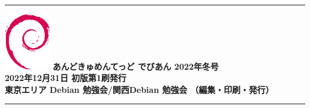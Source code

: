 \documentclass[mingoth,a4paper]{jsarticle}
\begin{document}
\vspace*{16cm}
{\color{dancerlightblue}\rule{\hsize}{1mm}}
\vspace{2mm}
\includegraphics[width=2cm]{../2005/image200502/openlogo-nd.eps}
\noindent \Large \bf あんどきゅめんてっど でびあん 2022年冬号\\
\noindent \normalfont 2022年12月31日 \hspace{5mm}  初版第1刷発行\\
\noindent \normalfont 東京エリア Debian 勉強会/関西Debian 勉強会 （編集・印刷・発行）\\
{\color{dancerdarkblue}\rule{\hsize}{1mm}}
\end{document}
